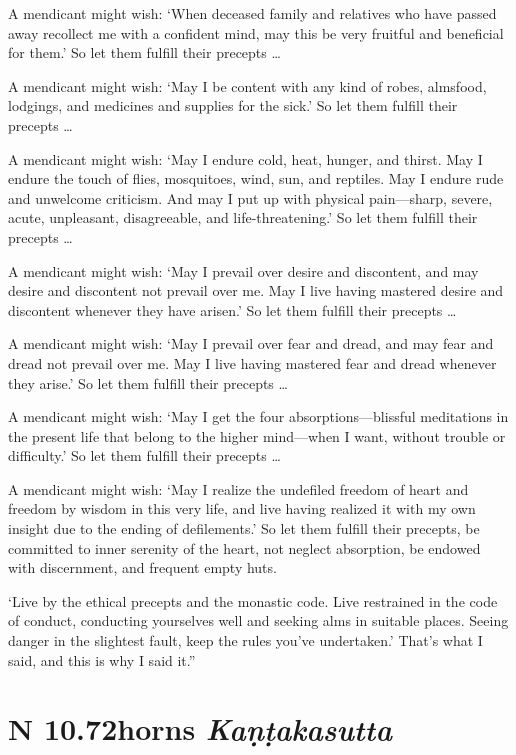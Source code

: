 \documentclass[12pt,openany]{book}%
\newcommand*{\suttatitleacronym}[1]{\smaller[2]{#1}\vspace*{.3em}}
\newcommand*{\suttatitletranslation}[1]{\linebreak{#1}}
\newcommand*{\suttatitleroot}[1]{\linebreak\smaller[2]\itshape{#1}}
\newcommand*{\tocacronym}[1]{\hspace*{-3.3em}{#1}\quad}
\newcommand*{\toctranslation}[1]{#1}
\newcommand*{\tocroot}[1]{(\textit{#1})}
\begin{document}
A mendicant might wish: ‘When deceased family and relatives who have passed away recollect me with a confident mind, may this be very fruitful and beneficial for them.’ So let them fulfill their precepts … 

A mendicant might wish: ‘May I be content with any kind of robes, almsfood, lodgings, and medicines and supplies for the sick.’ So let them fulfill their precepts … 

A mendicant might wish: ‘May I endure cold, heat, hunger, and thirst. May I endure the touch of flies, mosquitoes, wind, sun, and reptiles. May I endure rude and unwelcome criticism. And may I put up with physical pain—sharp, severe, acute, unpleasant, disagreeable, and life-threatening.’ So let them fulfill their precepts … 

A mendicant might wish: ‘May I prevail over desire and discontent, and may desire and discontent not prevail over me. May I live having mastered desire and discontent whenever they have arisen.’ So let them fulfill their precepts … 

A mendicant might wish: ‘May I prevail over fear and dread, and may fear and dread not prevail over me. May I live having mastered fear and dread whenever they arise.’ So let them fulfill their precepts … 

A mendicant might wish: ‘May I get the four absorptions—blissful meditations in the present life that belong to the higher mind—when I want, without trouble or difficulty.’ So let them fulfill their precepts … 

A mendicant might wish: ‘May I realize the undefiled freedom of heart and freedom by wisdom in this very life, and live having realized it with my own insight due to the ending of defilements.’ So let them fulfill their precepts, be committed to inner serenity of the heart, not neglect absorption, be endowed with discernment, and frequent empty huts. 

‘Live by the ethical precepts and the monastic code. Live restrained in the code of conduct, conducting yourselves well and seeking alms in suitable places. Seeing danger in the slightest fault, keep the rules you’ve undertaken.’ That’s what I said, and this is why I said it.” 

%
\section*{{\suttatitleacronym AN 10.72}{\suttatitletranslation Thorns }{\suttatitleroot Kaṇṭakasutta}}
\addcontentsline{toc}{section}{\tocacronym{AN 10.72} \toctranslation{Thorns } \tocroot{Kaṇṭakasutta}}
\end{document}
